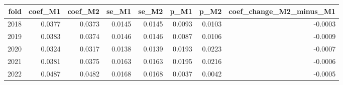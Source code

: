 \begin{tabular}{rrrrrrrr}
\toprule
fold & coef\_M1 & coef\_M2 & se\_M1 & se\_M2 & p\_M1 & p\_M2 & coef\_change\_M2\_minus\_M1 \\
\midrule
2018 & 0.0377 & 0.0373 & 0.0145 & 0.0145 & 0.0093 & 0.0103 & -0.0003 \\
2019 & 0.0383 & 0.0374 & 0.0146 & 0.0146 & 0.0087 & 0.0106 & -0.0009 \\
2020 & 0.0324 & 0.0317 & 0.0138 & 0.0139 & 0.0193 & 0.0223 & -0.0007 \\
2021 & 0.0381 & 0.0375 & 0.0163 & 0.0163 & 0.0195 & 0.0216 & -0.0006 \\
2022 & 0.0487 & 0.0482 & 0.0168 & 0.0168 & 0.0037 & 0.0042 & -0.0005 \\
\bottomrule
\end{tabular}
